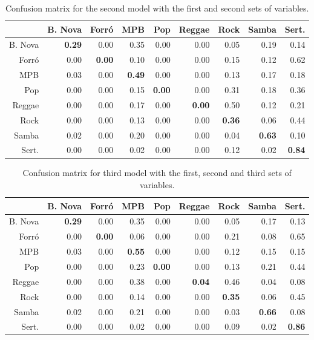 \documentclass[twocolumn]{article}
\begin{document}
\begin{table}[ht]
\caption{Confusion matrix for the second model
with the first and second sets of variables.}
\small
\vspace{3mm}
 \setlength\tabcolsep{1.5pt}
\centering
\begin{tabular}{rrrrrrrrr}
 & B. Nova & Forró & MPB & Pop & Reggae & Rock & Samba & Sert. \\ 
  \hline
B. Nova  & \textbf{0.29} & 0.00 & 0.35 & 0.00 & 0.00 & 0.05 & 0.19 & 0.14 \\ 
  Forró     & 0.00 & \textbf{0.00} & 0.10 & 0.00 & 0.00 & 0.15 & 0.12 & 0.62 \\ 
  MPB       & 0.03 & 0.00 & \textbf{0.49} & 0.00 & 0.00 & 0.13 & 0.17 & 0.18 \\ 
  Pop       & 0.00 & 0.00 & 0.15 & \textbf{0.00} & 0.00 & 0.31 & 0.18 & 0.36 \\ 
  Reggae    & 0.00 & 0.00 & 0.17 & 0.00 & \textbf{0.00} & 0.50 & 0.12 & 0.21 \\ 
  Rock      & 0.00 & 0.00 & 0.13 & 0.00 & 0.00 & \textbf{0.36} & 0.06 & 0.44 \\ 
  Samba     & 0.02 & 0.00 & 0.20 & 0.00 & 0.00 & 0.04 & \textbf{0.63} & 0.10 \\ 
  Sert. & 0.00 & 0.00 & 0.02 & 0.00 & 0.00 & 0.12 & 0.02 & \textbf{0.84} \\
     \hline
\end{tabular}
\label{tab:conf_2}
\end{table}



\begin{table}[ht]
\caption{Confusion matrix for third model with the first, second and third sets of variables.}
\small
\vspace{3mm}
 \setlength\tabcolsep{1.5pt}
\centering
\begin{tabular}{rrrrrrrrr}
 & B. Nova & Forró & MPB & Pop & Reggae & Rock & Samba & Sert. \\ 
  \hline
B. Nova  & \textbf{0.29} & 0.00 & 0.35 & 0.00 & 0.00 & 0.05 & 0.17 & 0.13 \\ 
  Forró     & 0.00 & \textbf{0.00} & 0.06 & 0.00 & 0.00 & 0.21 & 0.08 & 0.65 \\ 
  MPB       & 0.03 & 0.00 & \textbf{0.55} & 0.00 & 0.00 & 0.12 & 0.15 & 0.15 \\ 
  Pop       & 0.00 & 0.00 & 0.23 & \textbf{0.00} & 0.00 & 0.13 & 0.21 & 0.44 \\ 
  Reggae    & 0.00 & 0.00 & 0.38 & 0.00 & \textbf{0.04} & 0.46 & 0.04 & 0.08 \\ 
  Rock      & 0.00 & 0.00 & 0.14 & 0.00 & 0.00 & \textbf{0.35} & 0.06 & 0.45 \\ 
  Samba     & 0.02 & 0.00 & 0.21 & 0.00 & 0.00 & 0.03 & \textbf{0.66} & 0.08 \\ 
  Sert. & 0.00 & 0.00 & 0.02 & 0.00 & 0.00 & 0.09 & 0.02 & \textbf{0.86} \\ 
     \hline
\end{tabular}
\label{tab:conf_3}
\end{table}
 
\end{document}
